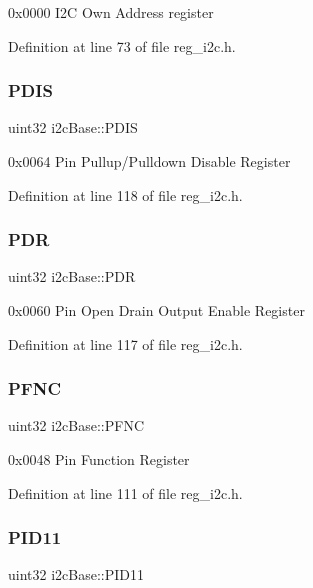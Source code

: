 0x0000 I2C Own Address register 

Definition at line 73 of file reg\+\_\+i2c.\+h.

\mbox{\label{structi2cBase_a239a4ecf5eca1585fa1aa410a79fea71}} 
\subsubsection{\texorpdfstring{P\+D\+IS}{PDIS}}
{\footnotesize\ttfamily uint32 i2c\+Base\+::\+P\+D\+IS}

0x0064 Pin Pullup/\+Pulldown Disable Register 

Definition at line 118 of file reg\+\_\+i2c.\+h.

\mbox{\label{structi2cBase_add2f13b4a10f8cad5b183782eb921643}} 
\subsubsection{\texorpdfstring{P\+DR}{PDR}}
{\footnotesize\ttfamily uint32 i2c\+Base\+::\+P\+DR}

0x0060 Pin Open Drain Output Enable Register 

Definition at line 117 of file reg\+\_\+i2c.\+h.

\mbox{\label{structi2cBase_af2b9ffc3fba4477b94ca6dbdb5588101}} 
\subsubsection{\texorpdfstring{P\+F\+NC}{PFNC}}
{\footnotesize\ttfamily uint32 i2c\+Base\+::\+P\+F\+NC}

0x0048 Pin Function Register 

Definition at line 111 of file reg\+\_\+i2c.\+h.

\mbox{\label{structi2cBase_ac2a8d3f7406280a2aceb78fd3177710f}} 
\subsubsection{\texorpdfstring{P\+I\+D11}{PID11}}
{\footnotesize\ttfamily uint32 i2c\+Base\+::\+P\+I\+D11}

